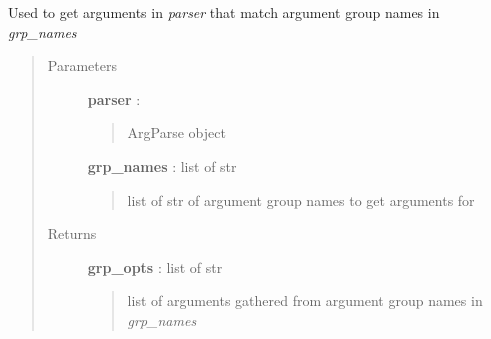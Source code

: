\documentclass[letterpaper,10pt,english]{sphinxmanual}
\begin{document}
\begin{fulllineitems}
\label{pytan.utils:pytan.utils.get_grp_opts}
Used to get arguments in \emph{parser} that match argument group names in \emph{grp\_names}
\begin{quote}\begin{description}
\item[{Parameters}] \leavevmode
\textbf{parser} : 
\begin{quote}

ArgParse object
\end{quote}

\textbf{grp\_names} : list of str
\begin{quote}

list of str of argument group names to get arguments for
\end{quote}

\item[{Returns}] \leavevmode
\textbf{grp\_opts} : list of str
\begin{quote}

list of arguments gathered from argument group names in \emph{grp\_names}
\end{quote}

\end{description}\end{quote}

\end{fulllineitems}

\end{document}

